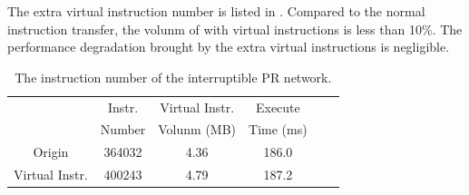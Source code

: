 The extra virtual instruction number is listed in . Compared to the normal instruction transfer, the volunm of with virtual instructions is less than 10\%. The performance degradation brought by the extra virtual instructions is negligible.





  
  


\begin{table}[t]
  \small
  \centering
  \caption{The instruction number of the interruptible PR network. }
\begin{tabular}{|c|c|c|c|c|c|}
  \hline
         & Instr.  & Virtual Instr. & Execute \bigstrut[t]\\
        & Number   & Volunm (MB) & Time (ms) \bigstrut[b]\\
  \hline
  Origin   &      364032      & 4.36 & 186.0 \bigstrut\\
  \hline
  Virtual Instr.   &     400243    & 4.79 & 187.2 \bigstrut\\
  \hline
  \end{tabular}%
  \label{tab:instrnum}%
\end{table}%

